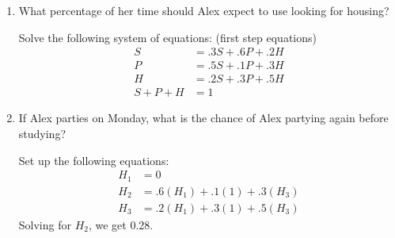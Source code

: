 \begin{enumerate}[label=(\alph*)]
\item What percentage of her time should Alex expect to use looking 
for housing?
\begin{solution}[2cm]
Solve the following system of equations: (first step equations)
\begin{equation}
\begin{split}
S &= .3S + .6P + .2H \\ \nonumber
P &= .5S + .1P + .3H \\
H &= .2S + .3P + .5H \\
S + P + H &= 1
\end{split}
\end{equation}
\end{solution}

\item If Alex parties on Monday, what is the chance of Alex partying 
again before studying?
\begin{solution}[2.4cm]
Set up the following equations:
\begin{equation}
\begin{split}
H_1 &= 0 \\ \nonumber
H_2 &= .6(H_1) + .1(1) + .3(H_3) \\
H_3 &= .2(H_1) + .3(1) + .5(H_3)
\end{split}
\end{equation}
Solving for $H_2$, we get 0.28.
\end{solution}

\end{enumerate}